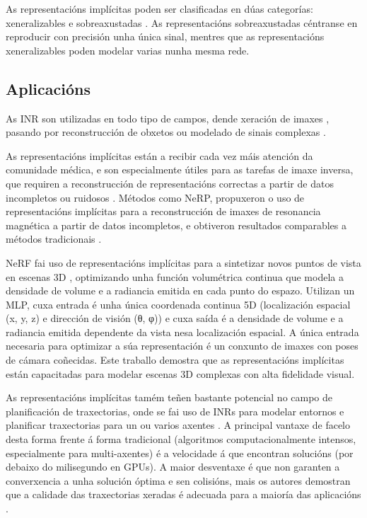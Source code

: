 As representacións implícitas poden ser clasificadas en dúas categorías: xeneralizables e sobreaxustadas \cite{yu2024neuraltrajectorymodelimplicit}. 
As representacións sobreaxustadas céntranse en reproducir con precisión unha única sinal, mentres que as representacións xeneralizables poden modelar varias nunha mesma rede.

\subsection{Aplicacións}
\label{subsec:Aplicacións}

As INR son utilizadas en todo tipo de campos, dende xeración de imaxes \cite{reddy2022multiimplicitneuralrepresentationfonts}, pasando por
reconstrucción de obxetos \cite{mildenhall2020nerfrepresentingscenesneural} \cite{mescheder2019occupancynetworkslearning3d} ou modelado de sinais complexas \cite{wu2021iremhighresolutionmagneticresonance}.

As representacións implícitas están a recibir cada vez máis atención da comunidade médica, e son 
especialmente útiles para as tarefas de imaxe inversa, que requiren a reconstrucción de representacións correctas a partir de datos incompletos ou ruidosos \cite{molaei2023implicitneuralrepresentationmedical}. 
Métodos como NeRP, propuxeron o uso de representacións implícitas para a reconstrucción de imaxes de resonancia magnética a partir de datos incompletos, 
e obtiveron resultados comparables a métodos tradicionais \cite{shen2023nerpimplicitneuralrepresentation}.

NeRF fai uso de representacións implícitas para a sintetizar novos puntos de vista en escenas 3D  \cite{mildenhall2020nerfrepresentingscenesneural}, 
 optimizando unha función volumétrica continua que modela a densidade de volume e a radiancia emitida en cada punto do espazo.
 Utilizan un MLP, cuxa entrada é unha única coordenada continua 5D (localización espacial (x, y, z) e dirección de visión (θ, φ)) 
 e cuxa saída é a densidade de volume e a radiancia emitida dependente da vista nesa localización espacial. 
A única entrada necesaria para optimizar a súa representación é un conxunto de imaxes con poses de cámara coñecidas. 
Este traballo demostra que as representacións implícitas están capacitadas para modelar escenas 3D complexas con alta fidelidade visual.
 
As representacións implícitas tamém teñen bastante potencial no campo de planificación de traxectorias, 
onde se fai uso de INRs para modelar entornos e planificar traxectorias para un ou varios axentes \cite{yu2024neuraltrajectorymodelimplicit}.
A principal vantaxe de facelo desta forma frente á forma tradicional (algoritmos computacionalmente intensos, especialmente para multi-axentes) é a velocidade á que encontran solucións (por debaixo do milisegundo en GPUs).
A maior desventaxe é que non garanten a converxencia a unha solución óptima e sen colisións, mais os autores demostran que a calidade das traxectorias xeradas é adecuada para a maioría das aplicacións \cite{trajectinr}.

